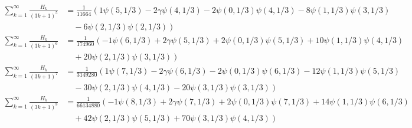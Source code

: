 \documentclass{article}
\theoremstyle{definition}
\begin{document}
\begin{align}
\sum_{k=1}^\infty \frac{H_k}{(3k+1)^5} &= \frac{1}{11664}\left(  1\psi(5,1/3) -2\gamma\psi(4,1/3) -2\psi(0,1/3)\psi(4,1/3) -8\psi(1,1/3)\psi(3,1/3)  \right. \nonumber \\ &\left. \hspace{1em}
-6\psi(2,1/3)\psi(2,1/3)\right) \\
\sum_{k=1}^\infty \frac{H_k}{(3k+1)^6} &= \frac{ 1}{174960}\left( -1\psi(6,1/3) +2\gamma\psi(5,1/3) +2\psi(0,1/3)\psi(5,1/3) +10\psi(1,1/3)\psi(4,1/3)  \right. \nonumber \\ &\left. \hspace{1em}
+20\psi(2,1/3)\psi(3,1/3)\right) \\
\sum_{k=1}^\infty \frac{H_k}{(3k+1)^7} &= \frac{1}{3149280}\left(  1\psi(7,1/3) -2\gamma\psi(6,1/3) -2\psi(0,1/3)\psi(6,1/3) -12\psi(1,1/3)\psi(5,1/3)  \right. \nonumber \\ &\left. \hspace{1em}
-30\psi(2,1/3)\psi(4,1/3) -20\psi(3,1/3)\psi(3,1/3)\right) \\
\sum_{k=1}^\infty \frac{H_k}{(3k+1)^8} &= \frac{ 1}{66134880}\left( -1\psi(8,1/3) +2\gamma\psi(7,1/3) +2\psi(0,1/3)\psi(7,1/3) +14\psi(1,1/3)\psi(6,1/3)  \right. \nonumber \\ &\left. \hspace{1em}
+42\psi(2,1/3)\psi(5,1/3) +70\psi(3,1/3)\psi(4,1/3)\right)
\end{align}
 
\end{document}
